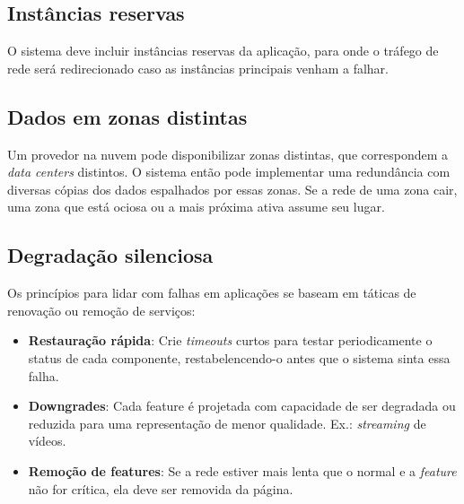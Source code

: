 	\subsection{Instâncias reservas}
	O sistema deve incluir instâncias reservas da aplicação, para onde o tráfego de rede será redirecionado caso as instâncias principais venham a falhar.

	\subsection{Dados em zonas distintas}
	Um provedor na nuvem pode disponibilizar zonas distintas, que correspondem a \textit{data centers} distintos. O sistema então pode implementar uma redundância com diversas cópias dos dados espalhados por essas zonas. Se a rede de uma zona cair, uma zona que está ociosa ou a mais próxima ativa assume seu lugar.
	
	\subsection{Degradação silenciosa}
 	Os princípios para lidar com falhas em aplicações se baseam em táticas de renovação ou remoção de serviços:
	
	\begin{itemize}
	\item
	\textbf{Restauração rápida}:
	Crie \textit{timeouts} curtos para testar periodicamente o status de cada componente, restabelencendo-o antes que o sistema sinta essa falha.

	\item
	\textbf{Downgrades}:
	Cada feature é projetada com capacidade de ser degradada ou reduzida para uma representação de menor qualidade. Ex.: \textit{streaming} de vídeos.

	\item
	\textbf{Remoção de features}:
	Se a rede estiver mais lenta que o normal e a \textit{feature} não for crítica, ela deve ser removida da página.

	\end{itemize}
	\iffalse
	\subsection{Exemplo: Netflix's Simian Army}

	\subsection{Exemplo: Skype Reverse NAT}
	\fi


